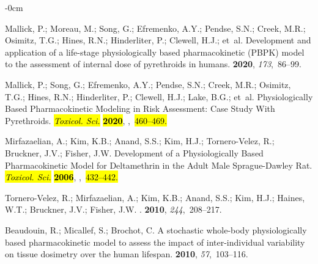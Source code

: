 \documentclass[toxics,article,accept,pdftex,moreauthors]{Definitions/mdpi}
\begin{document}
\begin{adjustwidth}{-\extralength}{0cm}
\begin{thebibliography}{999}
Mallick, P.; Moreau, M.; Song, G.; Efremenko, A.Y.; Pendse, S.N.; Creek, M.R.;
  Osimitz, T.G.; Hines, R.N.; Hinderliter, P.; Clewell, H.J.;  et~al.
\newblock Development and application of a life-stage physiologically based
  pharmacokinetic (PBPK) model to the assessment of internal dose of
  pyrethroids in humans.
 {\bf 2020}, {\em 173},~86--99.

Mallick, P.; Song, G.; Efremenko, A.Y.; Pendse, S.N.; Creek, M.R.; Osimitz,
  T.G.; Hines, R.N.; Hinderliter, P.; Clewell, H.J.; Lake, B.G.;  et~al.
\newblock Physiologically Based Pharmacokinetic Modeling in Risk Assessment:
  Case Study With Pyrethroids. \emph{\hl{Toxicol. Sci.} %
} \textbf{\hl{2020}},
,~\hl{460--469.} %



Mirfazaelian, A.; Kim, K.B.; Anand, S.S.; Kim, H.J.; Tornero-Velez, R.;
  Bruckner, J.V.; Fisher, J.W.
\newblock Development of a Physiologically Based Pharmacokinetic Model for
  Deltamethrin in the Adult Male Sprague-Dawley Rat. \emph{\hl{Toxicol. Sci.} %
} \textbf{\hl{2006}},
,~\hl{432--442.} %


Tornero-Velez, R.; Mirfazaelian, A.; Kim, K.B.; Anand, S.S.; Kim, H.J.; Haines,
  W.T.; Bruckner, J.V.; Fisher, J.W.
.
 {\bf 2010}, {\em
  244},~208--217.

Beaudouin, R.; Micallef, S.; Brochot, C.
\newblock A stochastic whole-body physiologically based pharmacokinetic model
  to assess the impact of inter-individual variability on tissue dosimetry over
  the human lifespan.
 {\bf 2010}, {\em
  57},~103--116.


\end{thebibliography}
\end{adjustwidth}
\end{document}

